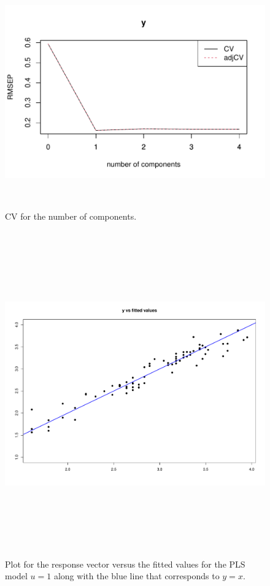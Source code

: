 \documentclass{article}
\theoremstyle{definition}
\begin{document}
\begin{figure}[h!]
	\centering
	\includegraphics[width=12cm,height=10cm]{cv.pdf}
	\caption{CV for the number of components.}
	\label{fig:1}
\end{figure}
\newpage
\begin{figure}[h!]
	\centering
	\includegraphics[width=16cm,height=14cm]{yvsfit.pdf}
	\caption{Plot for the response vector versus the fitted values for the PLS model $u=1$ along with the blue line that corresponds to $y=x$.}
	\label{fig:2}
\end{figure}
\end{document}

